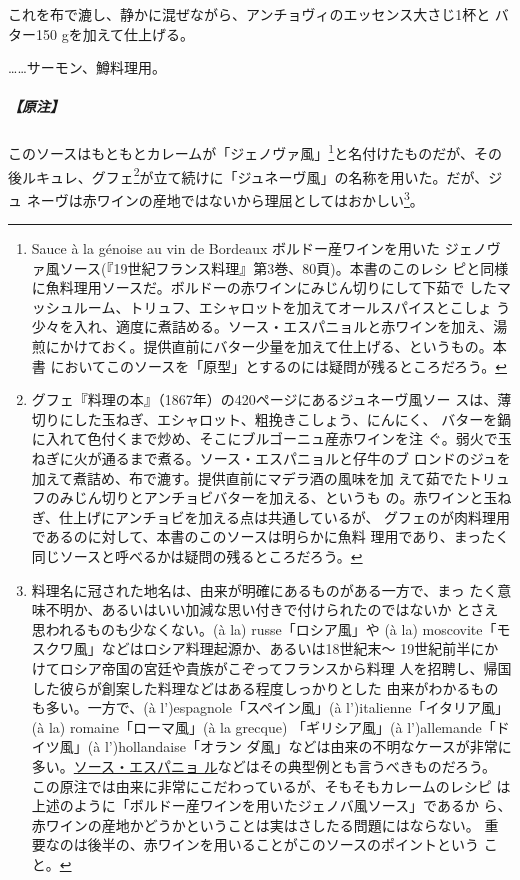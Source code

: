 \begin{recette}
これを布で漉し、静かに混ぜながら、アンチョヴィのエッセンス大さじ1杯と
バター150 gを加えて仕上げる。

\ldots{}\ldots{}サーモン、鱒料理用。

\hypertarget{ux539fux6ce8-3}{%
\subparagraph{【原注】}\label{ux539fux6ce8-3}}

このソースはもともとカレームが「ジェノヴァ風」\footnote{Sauce à la
  génoise au vin de Bordeaux ボルドー産ワインを用いた
  ジェノヴァ風ソース(『19世紀フランス料理』第3巻、80頁)。本書のこのレシ
  ピと同様に魚料理用ソースだ。ボルドーの赤ワインにみじん切りにして下茹で
  したマッシュルーム、トリュフ、エシャロットを加えてオールスパイスとこしょ
  う少々を入れ、適度に煮詰める。ソース・エスパニョルと赤ワインを加え、湯
  煎にかけておく。提供直前にバター少量を加えて仕上げる、というもの。本書
  においてこのソースを「原型」とするのには疑問が残るところだろう。}と名付けたものだが、その
後ルキュレ、グフェ\footnote{グフェ『料理の本』（1867年）の420ページにあるジュネーヴ風ソー
  スは、薄切りにした玉ねぎ、エシャロット、粗挽きこしょう、にんにく、
  バターを鍋に入れて色付くまで炒め、そこにブルゴーニュ産赤ワインを注
  ぐ。弱火で玉ねぎに火が通るまで煮る。ソース・エスパニョルと仔牛のブ
  ロンドのジュを加えて煮詰め、布で漉す。提供直前にマデラ酒の風味を加
  えて茹でたトリュフのみじん切りとアンチョビバターを加える、というも
  の。赤ワインと玉ねぎ、仕上げにアンチョビを加える点は共通しているが、
  グフェのが肉料理用であるのに対して、本書のこのソースは明らかに魚料
  理用であり、まったく同じソースと呼べるかは疑問の残るところだろう。}が立て続けに「ジュネーヴ風」の名称を用いた。だが、ジュ
ネーヴは赤ワインの産地ではないから理屈としてはおかしい\footnote{料理名に冠された地名は、由来が明確にあるものがある一方で、まっ
  たく意味不明か、あるいはいい加減な思い付きで付けられたのではないか
  とさえ思われるものも少なくない。(à la) russe「ロシア風」や (à la)
  moscovite「モスクワ風」などはロシア料理起源か、あるいは18世紀末〜
  19世紀前半にかけてロシア帝国の宮廷や貴族がこぞってフランスから料理
  人を招聘し、帰国した彼らが創案した料理などはある程度しっかりとした
  由来がわかるものも多い。一方で、(à l')espagnole「スペイン風」(à
  l')italienne「イタリア風」(à la) romaine「ローマ風」(à la grecque)
  「ギリシア風」(à l')allemande「ドイツ風」(à l')hollandaise「オラン
  ダ風」などは由来の不明なケースが非常に多い。\protect\hyperlink{sauce-espagnole}{ソース・エスパニョ
  ル}などはその典型例とも言うべきものだろう。\\
  この原注では由来に非常にこだわっているが、そもそもカレームのレシピ
  は上述のように「ボルドー産ワインを用いたジェノバ風ソース」であるか
  ら、赤ワインの産地かどうかということは実はさしたる問題にはならない。
  重要なのは後半の、赤ワインを用いることがこのソースのポイントという
  こと。}。


\end{recette}

